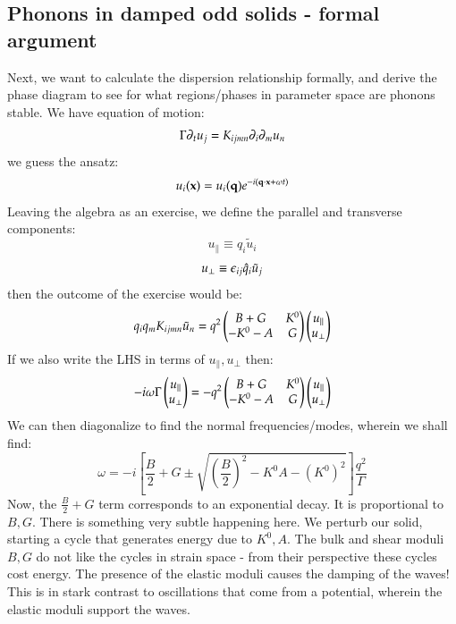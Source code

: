\subsection{Phonons in damped odd solids - formal argument}
Next, we want to calculate the dispersion relationship formally, and derive the phase diagram to see for what regions/phases in parameter space are phonons stable. We have equation of motion:
\begin{equation}
    \Gamma\partial_t u_j = K_{ijmn}\partial_i \partial_m u_n
\end{equation}
we guess the ansatz:
\begin{equation}
    u_i(\mathbf{x}) =  u_i(\mathbf{q})e^{-i(\mathbf{q} \cdot \mathbf{x} + \omega t)}
\end{equation}
Leaving the algebra as an exercise, we define the parallel and transverse components:
\begin{equation}
    u_\parallel \equiv \hat{q}_i \tilde{u}_i
\end{equation}
\begin{equation}
    u_\perp \equiv \epsilon_{ij}\hat{q}_i \tilde{u}_j
\end{equation}
then the outcome of the exercise would be:
\begin{equation}
    q_i q_m K_{ijmn}\tilde{u}_n = q^2\begin{pmatrix}B + G & K^0 \\ -K^0 - A & G\end{pmatrix}\begin{pmatrix}u_\parallel \\ u_\perp\end{pmatrix}
\end{equation}
If we also write the LHS in terms of $u_\parallel, u_\perp$ then:
\begin{equation}
    -i\omega \Gamma\begin{pmatrix}u_\parallel \\ u_\perp\end{pmatrix} = -q^2\begin{pmatrix}B + G & K^0 \\ -K^0 - A & G\end{pmatrix}\begin{pmatrix}u_\parallel \\ u_\perp\end{pmatrix}
\end{equation}
We can then diagonalize to find the normal frequencies/modes, wherein we shall find:
\begin{equation}
    \omega = -i\left[\frac{B}{2} + G \pm \sqrt{\left(\frac{B}{2}\right)^2 - K^0A  - (K^0)^2}\right]\frac{q^2}{\Gamma}
\end{equation}
Now, the $\frac{B}{2} + G$ term corresponds to an exponential decay. It is proportional to $B, G$. There is something very subtle happening here. We perturb our solid, starting a cycle that generates energy due to $K^0, A$. The bulk and shear moduli $B, G$ do not like the cycles in strain space - from their perspective these cycles cost energy. The presence of the elastic moduli causes the damping of the waves! This is in stark contrast to oscillations that come from a potential, wherein the elastic moduli support the waves.

